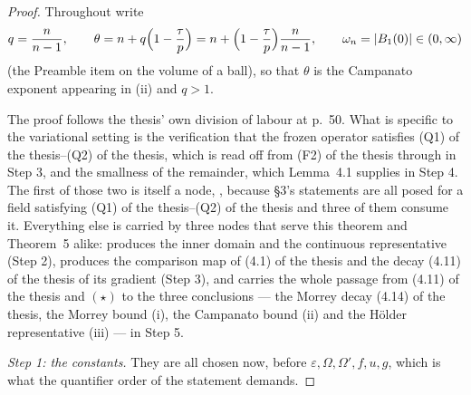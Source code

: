 \begin{proof}
Throughout write
\[
q=\frac n{n-1},\qquad
\theta=n+q\Bigl(1-\frac\tau p\Bigr)
=n+\Bigl(1-\frac\tau p\Bigr)\frac n{n-1},
\qquad
\omega_n=|B_1(0)|\in(0,\infty)
\]
(the Preamble item on the volume of a ball), so that $\theta$ is the Campanato
exponent appearing in (ii) and $q>1$.

The proof follows the thesis' own division of labour at p.~50.  What is
specific to the variational setting is the verification that the frozen
operator satisfies (Q1) of the thesis--(Q2) of the thesis, which is read off from
(F2) of the thesis through  in Step 3, and the
smallness of the remainder, which Lemma~4.1 supplies in Step 4.  The first of
those two is itself a node, , because \S3's
statements are all posed for a field satisfying
(Q1) of the thesis--(Q2) of the thesis and three of them consume it.  Everything else is
carried by three nodes that serve this theorem and Theorem~5 alike:  produces the
inner domain and the continuous representative (Step 2),
 produces the comparison map of (4.1) of the thesis
and the decay (4.11) of the thesis of its gradient (Step 3), and
 carries the whole passage from
(4.11) of the thesis and $(\star)$ to the three conclusions --- the Morrey decay
(4.14) of the thesis, the Morrey bound (i), the Campanato bound (ii) and the
H\"older representative (iii) --- in Step 5.

\emph{Step 1: the constants.}  They are all chosen now, before
$\varepsilon,\Omega,\Omega',f,u,g$, which is what the quantifier order of the
statement demands.


\end{proof}

